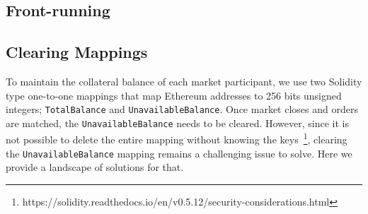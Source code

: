 \subsection{Front-running} \label{sec:front}

\subsection{Clearing Mappings}

To maintain the collateral balance of each market participant, we use two Solidity type one-to-one mappings that map Ethereum addresses to 256 bits unsigned integers; \texttt{TotalBalance} and \texttt{UnavailableBalance}. Once market closes and orders are matched, the \texttt{UnavailableBalance} needs to be cleared. However, since it is not possible to delete the entire mapping without knowing the keys~\footnote{https://solidity.readthedocs.io/en/v0.5.12/security-considerations.html}, clearing the \texttt{UnavailableBalance} mapping remains a challenging issue to solve. Here we provide a landscape of solutions for that.

